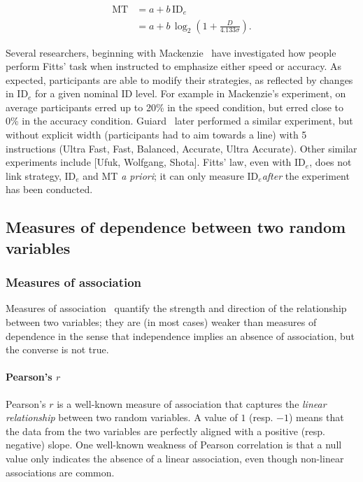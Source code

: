 \documentclass[manuscript,review,anonymous]{acmart}
\newcommand{\ide}{\ensuremath{{\text{ID}_e}}\xspace}
\begin{document}
\begin{align}
	\text{MT} & = a + b\,\text{ID}_e                                                   \\
	          & = a + b\,\log_2 \left(1 + \frac{D}{4.133\sigma}\right). \label{eq:ide}
\end{align}

Several researchers, beginning with Mackenzie~\cite{mackenzie2008} have investigated how people perform Fitts' task when instructed to emphasize either speed or accuracy. As expected, participants are able to modify their strategies, as reflected by changes in \ide for a given nominal ID level.
For example in Mackenzie's experiment, on average participants erred up to 20\% in the speed condition, but erred close to 0\% in the accuracy condition. Guiard~\cite{guiard2011} later performed a similar experiment, but without explicit width (participants had to aim towards a line) with 5 instructions (Ultra Fast, Fast, Balanced, Accurate, Ultra Accurate). Other similar experiments include [Ufuk, Wolfgang, Shota].
Fitts' law, even with \ide, does not link strategy, \ide and MT \textit{a priori}; it can only measure \ide \textit{after} the experiment has been conducted.


\subsection{Measures of dependence between two random variables\label{subs:rw::dependence}
}

\subsubsection{Measures of association}
Measures of association~\cite{nelsen2006} quantify the strength and direction of the relationship between two variables; they are (in most cases) weaker than measures of dependence in the sense that independence implies an absence of association, but the converse is not true.

\paragraph{Pearson's $r$} Pearson's $r$ is a well-known measure of association that captures the \textit{linear relationship} between two random variables. A value of $1$ (resp. $-1$) means that the data from the two variables are perfectly aligned with a positive (resp. negative) slope. One well-known weakness of Pearson correlation is that a null value only indicates the absence of a linear association, even though non-linear associations are common.
\end{document}
